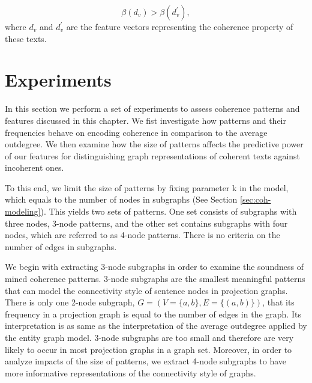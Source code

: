 \begin{equation}
\beta (d_v) > \beta (d^\prime_v),
\end{equation}
where $d_v$ and $d^\prime_v$ are the feature vectors representing the coherence property of these texts. 

\section{Experiments}
\label{sec:exp}

In this section we perform a set of experiments to assess coherence patterns and features discussed in this chapter. 
We fist investigate how patterns and their frequencies behave on encoding coherence in comparison to the average outdegree.  
We then examine how the size of patterns affects the predictive power of our features for distinguishing graph representations of coherent texts against incoherent ones. 

To this end, we limit the size of patterns by fixing parameter k in the model, which equals to the number of nodes in subgraphs (See Section \ref{sec:coh-modeling}). 
This yields two sets of patterns. 
One set consists of subgraphs with three nodes, 3-node patterns, and the other set contains subgraphs with four nodes, which are referred to as 4-node patterns.  
There is no criteria on the number of edges in subgraphs.  

We begin with extracting 3-node subgraphs in order to examine the soundness of mined coherence patterns.  
3-node subgraphs are the smallest meaningful patterns that can model the connectivity style of sentence nodes in projection graphs. 
There is only one 2-node subgraph, $G = \left( V = \lbrace a,b \rbrace, E=\lbrace \left( a, b \right) \rbrace \right)$, that its frequency in a projection graph is equal to the number of edges in the graph. 
Its interpretation is as same as the interpretation of the average outdegree applied by the entity graph model.  
3-node subgraphs are too small and therefore are very likely to occur in most projection graphs in a graph set. 
Moreover, in order to analyze impacts of the size of patterns, we extract 4-node subgraphs to have more informative representations of the connectivity style of graphs. 


